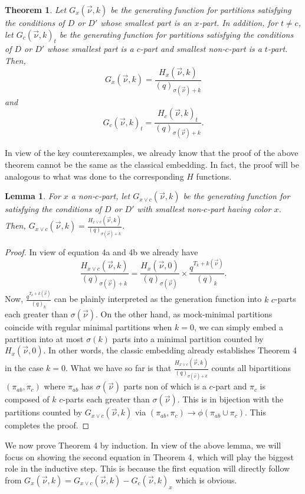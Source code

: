 \documentclass[12pt,a4paper]{amsart}
\newtheorem{theorem}{Theorem}
\newtheorem{lemma}{Lemma}
\theoremstyle{definition}
\theoremstyle{notation}
\theoremstyle{corollary}
\begin{document}
\begin{theorem}
Let $G_{x}(\vec{\nu},k)$ be the generating function for partitions satisfying the conditions of $D$ or $D'$ whose smallest part is an $x$-part. In addition, for $t\not=c$, let $G_c(\vec{\nu},k)_{t}$ be the generating function for partitions satisfying the conditions of $D$ or $D'$ whose smallest part is a $c$-part and smallest non-$c$-part is a $t$-part. Then,
\[G_{x}(\vec{\nu},k)=\frac{H_{x}(\vec{\nu},k)}{(q)_{\sigma(\vec{\nu})+k}}\]
and \[G_{c}(\vec{\nu},k)_t=\frac{H_{c}(\vec{\nu},k)_t}{(q)_{\sigma(\vec{\nu})+k}}.\]
\end{theorem}
In view of the key counterexamples, we already know that the proof of the above theorem cannot be the same as the classical embedding. In fact, the proof will be analogous to what was done to the corresponding $H$ functions. 
\begin{lemma}
For $x$ a non-$c$-part, let $G_{x\lor c}(\vec{\nu},k)$ be the generating function for satisfying the conditions of $D$ or $D'$ with smallest non-$c$-part having color $x$. Then, $G_{x\lor c}(\vec{\nu},k)=\frac{H_{x\lor c}(\vec{\nu},k)}{(q)_{\sigma(\vec{\nu})+k}}$.  
\end{lemma}
\begin{proof}
In view of equation 4a and 4b we already have \[\frac{H_{x\lor c}(\vec{\nu},k)}{(q)_{\sigma(\vec{\nu})+k}}=\frac{H_{x}(\vec{\nu},0)}{(q)_{\sigma(\vec{\nu})}}\times \frac{q^{T_{k}+k(\vec{\nu})}}{(q)_k}.\]
Now, $\frac{q^{T_{k}+k(\vec{\nu})}}{(q)_k}$ can be plainly interpreted as the generation function into $k$ $c$-parts each greater than $\sigma(\vec{\nu})$. On the other hand, as mock-minimal partitions coincide with regular minimal partitions when $k=0$, we can simply embed a partition into at most $\sigma(k)$ parts into a minimal partition counted by $H_x(\vec{\nu},0)$. In other words, the classic embedding already establishes Theorem 4 in the case $k=0$. What we have so far is that $\frac{H_{x\lor c}(\vec{\nu},k)}{(q)_{\sigma(\vec{\nu})+k}}$ counts all bipartitions $(\pi_{ab},\pi_c)$ where $\pi_{ab}$ has $\sigma(\vec{\nu})$ parts non of which is a $c$-part and $\pi_c$ is composed of $k$ $c$-parts each greater than $\sigma(\vec{\nu})$. This is in bijection with the partitions counted by $G_{x\lor c}(\vec{\nu},k)$ via $(\pi_{ab},\pi_c)\to \phi(\pi_{ab}\cup\pi_c)$. This completes the proof. 
\end{proof}

We now prove Theorem 4 by induction. In view of the above lemma, we will focus on showing the second equation in Theorem 4, which will play the biggest role in the inductive step. This is because the first equation will directly follow from $G_{x}(\vec{\nu},k)=G_{x\lor c}(\vec{\nu},k)-G_{c}(\vec{\nu},k)_x$ which is obvious.
\end{document}
